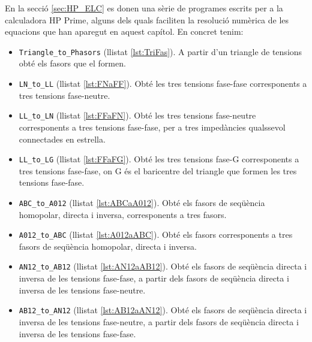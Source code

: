En la secció \vref{sec:HP_ELC} es donen  una sèrie de programes escrits per a la calculadora \textsf{HP Prime},
 alguns dels quals faciliten la resolució numèrica de les equacions que han aparegut en aquest capítol. En concret tenim:

\begin{itemize}
   \item \texttt{Triangle\_to\_Phasors} (llistat \vref{lst:TriFas}). A partir d'un triangle de tensions obté els fasors que el formen.
   \item \texttt{LN\_to\_LL} (llistat \vref{lst:FNaFF}). Obté les tres tensions fase-fase corresponents a tres tensions fase-neutre.
   \item \texttt{LL\_to\_LN} (llistat \vref{lst:FFaFN}). Obté les tres tensions fase-neutre corresponents a tres tensions fase-fase, per a tres impedàncies qualssevol connectades en estrella.
   \item \texttt{LL\_to\_LG} (llistat \vref{lst:FFaFG}). Obté les tres tensions fase-G corresponents a tres tensions fase-fase, on G és el baricentre del triangle que formen les tres tensions fase-fase.
   \item \texttt{ABC\_to\_A012} (llistat \vref{lst:ABCaA012}). Obté els fasors de seqüència homopolar, directa i inversa, corresponents a tres fasors.
   \item \texttt{A012\_to\_ABC} (llistat \vref{lst:A012aABC}). Obté els  fasors corresponents a tres fasors de seqüència homopolar, directa i inversa.
   \item \texttt{AN12\_to\_AB12} (llistat \vref{lst:AN12aAB12}). Obté els fasors de seqüència directa i inversa de les tensions fase-fase, a partir dels fasors de seqüència directa i inversa de les tensions fase-neutre.
   \item \texttt{AB12\_to\_AN12} (llistat \vref{lst:AB12aAN12}). Obté els fasors de seqüència directa i inversa de les tensions fase-neutre, a partir dels fasors de seqüència directa i inversa de les tensions fase-fase.
\end{itemize}

